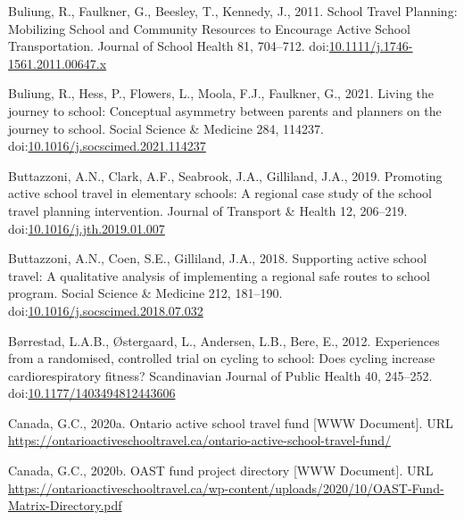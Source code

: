 \documentclass[]{elsarticle} %
\begin{document}
\leavevmode\hypertarget{ref-buliungSchoolTravelPlanning2011}{}%
Buliung, R., Faulkner, G., Beesley, T., Kennedy, J., 2011. School Travel
Planning: Mobilizing School and Community Resources to Encourage Active
School Transportation. Journal of School Health 81, 704--712.
doi:\href{https://doi.org/10.1111/j.1746-1561.2011.00647.x}{10.1111/j.1746-1561.2011.00647.x}

\leavevmode\hypertarget{ref-buliungLivingJourneySchool2021}{}%
Buliung, R., Hess, P., Flowers, L., Moola, F.J., Faulkner, G., 2021.
Living the journey to school: Conceptual asymmetry between parents and
planners on the journey to school. Social Science \& Medicine 284,
114237.
doi:\href{https://doi.org/10.1016/j.socscimed.2021.114237}{10.1016/j.socscimed.2021.114237}

\leavevmode\hypertarget{ref-buttazzoniPromotingActiveSchool2019}{}%
Buttazzoni, A.N., Clark, A.F., Seabrook, J.A., Gilliland, J.A., 2019.
Promoting active school travel in elementary schools: A regional case
study of the school travel planning intervention. Journal of Transport
\& Health 12, 206--219.
doi:\href{https://doi.org/10.1016/j.jth.2019.01.007}{10.1016/j.jth.2019.01.007}

\leavevmode\hypertarget{ref-buttazzoniSupportingActiveSchool2018}{}%
Buttazzoni, A.N., Coen, S.E., Gilliland, J.A., 2018. Supporting active
school travel: A qualitative analysis of implementing a regional safe
routes to school program. Social Science \& Medicine 212, 181--190.
doi:\href{https://doi.org/10.1016/j.socscimed.2018.07.032}{10.1016/j.socscimed.2018.07.032}

\leavevmode\hypertarget{ref-borrestadExperiencesRandomisedControlled2012}{}%
Børrestad, L.A.B., Østergaard, L., Andersen, L.B., Bere, E., 2012.
Experiences from a randomised, controlled trial on cycling to school:
Does cycling increase cardiorespiratory fitness? Scandinavian Journal of
Public Health 40, 245--252.
doi:\href{https://doi.org/10.1177/1403494812443606}{10.1177/1403494812443606}

\leavevmode\hypertarget{ref-GreenCommunities2016}{}%
Canada, G.C., 2020a. Ontario active school travel fund {[}WWW
Document{]}. URL
\url{https://ontarioactiveschooltravel.ca/ontario-active-school-travel-fund/}

\leavevmode\hypertarget{ref-GreenCommunitiesProjects}{}%
Canada, G.C., 2020b. OAST fund project directory {[}WWW Document{]}. URL
\url{https://ontarioactiveschooltravel.ca/wp-content/uploads/2020/10/OAST-Fund-Matrix-Directory.pdf}
\end{document}
